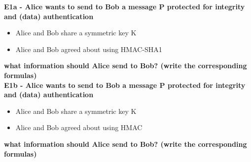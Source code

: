 \textbf{E1a - Alice wants to send to Bob a message P protected for integrity and (data) authentication}
\begin{itemize}
    \item Alice and Bob share a symmetric key K
    \item Alice and Bob agreed about using HMAC-SHA1
\end{itemize}
\textbf{what information should Alice send to Bob? (write the corresponding formulas)\\}
\textbf{E1b - Alice wants to send to Bob a message P protected for integrity and (data) authentication}
\begin{itemize}
    \item Alice and Bob share a symmetric key K
    \item Alice and Bob agreed about using HMAC
\end{itemize}
\textbf{what information should Alice send to Bob? (write the corresponding formulas)\\}

